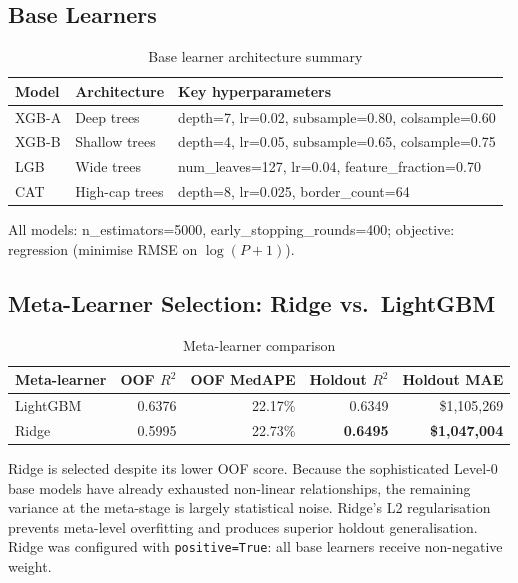 \documentclass[11pt, a4paper, twoside]{article}
\begin{document}
\subsection{Base Learners}
\begin{table}[H]
  \centering
  \caption{Base learner architecture summary}
  \label{tab:base_learners}
  \begin{tabular}{lll}
    \toprule
    Model & Architecture & Key hyperparameters \\
    \midrule
    XGB-A & Deep trees   & depth=7, lr=0.02, subsample=0.80, colsample=0.60 \\
    XGB-B & Shallow trees& depth=4, lr=0.05, subsample=0.65, colsample=0.75 \\
    LGB   & Wide trees   & num\_leaves=127, lr=0.04, feature\_fraction=0.70 \\
    CAT   & High-cap trees& depth=8, lr=0.025, border\_count=64 \\
    \bottomrule
  \end{tabular}
\end{table}
All models: n\_estimators=5000, early\_stopping\_rounds=400; objective:
regression (minimise RMSE on $\log(P+1)$).

\subsection{Meta-Learner Selection: Ridge vs.\ LightGBM}
\begin{table}[H]
  \centering
  \caption{Meta-learner comparison}
  \label{tab:meta_comparison}
  \begin{tabular}{lrrrr}
    \toprule
    Meta-learner & OOF $R^2$ & OOF MedAPE & Holdout $R^2$ & Holdout MAE \\
    \midrule
    LightGBM & 0.6376 & 22.17\% & 0.6349 & \$1,105,269 \\
    Ridge    & 0.5995 & 22.73\% & \textbf{0.6495} & \textbf{\$1,047,004} \\
    \bottomrule
  \end{tabular}
\end{table}
Ridge is selected despite its lower OOF score. Because the sophisticated
Level-0 base models have already exhausted non-linear relationships, the
remaining variance at the meta-stage is largely statistical noise. Ridge's L2
regularisation prevents meta-level overfitting and produces superior holdout
generalisation. Ridge was configured with \texttt{positive=True}: all base
learners receive non-negative weight.
\end{document}

